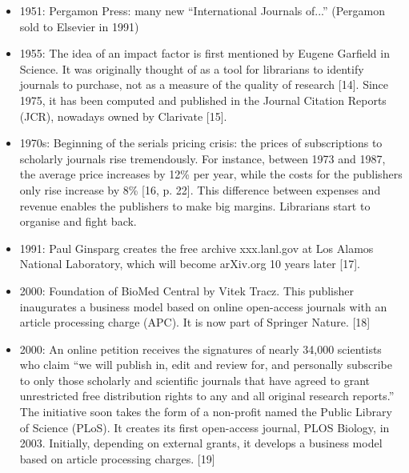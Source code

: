 \documentclass[10pt,compress,serif]{beamer}
\begin{document}
 
 \begin{frame}[t]%
 \vskip1cm%
\begin{itemize}

 \item 1951: Pergamon Press: many new ``International Journals of...''
   (Pergamon sold to Elsevier in 1991)%
 \item 1955: The idea of an impact factor is first mentioned by Eugene Garfield in Science. It was originally thought of as a tool for librarians to identify journals to purchase, not as a measure of the quality of research [14]. Since 1975, it has been computed and published in the Journal Citation Reports (JCR), nowadays owned by Clarivate [15].
 \item 1970s: Beginning of the serials pricing crisis: the prices of subscriptions to scholarly journals rise tremendously. For instance, between 1973 and 1987, the average price increases by 12\% per year, while the costs for the publishers only rise increase by 8\% [16, p. 22]. This difference between expenses and revenue enables the publishers to make big margins. Librarians start to organise and fight back.
 \item 1991: Paul Ginsparg creates the free archive xxx.lanl.gov at Los Alamos National Laboratory, which will become arXiv.org 10 years later [17].
   \item 2000: Foundation of BioMed Central by Vitek Tracz. This publisher inaugurates a business model based on online open-access journals with an article processing charge (APC). It is now part of Springer Nature. [18]
 \item 2000: An online petition receives the signatures of nearly 34,000 scientists who claim “we will publish in, edit and review for, and personally subscribe to only those scholarly and scientific journals that have agreed to grant unrestricted free distribution rights to any and all original research reports.” The initiative soon takes the form of a non-profit named the Public Library of Science (PLoS). It creates its first open-access journal, PLOS Biology, in 2003. Initially, depending on external grants, it develops a business model based on article processing charges. [19]


\end{itemize}
\end{frame}
\end{document}
